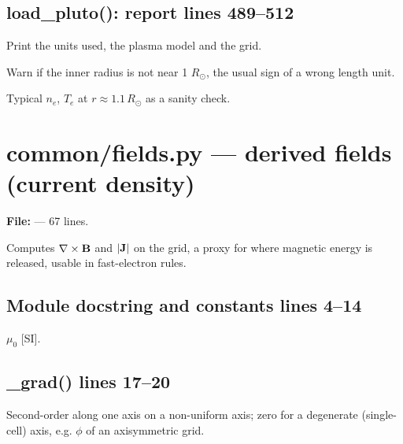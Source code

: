 \section*{\normalsize load\_pluto(): report \hfill{\small\mdseries\color{gray}lines 489--512}}

\begin{lines}
\item[L.493–499] Print the units used, the plasma model and the grid.
\item[L.500–502] Warn if the inner radius is not near 1 $R_\odot$, the usual sign of a wrong length unit.
\item[L.504–509] Typical $n_e$, $T_e$ at $r\approx1.1\,R_\odot$ as a sanity check.
\end{lines}

\chapter{common/fields.py --- derived fields (current density)}
\label{mod:common:fields.py}
\textbf{File:}  --- 67 lines.

Computes $\nabla\times\mathbf{B}$ and $|\mathbf{J}|$ on the grid, a proxy for where magnetic
energy is released, usable in fast-electron rules.

\section*{\normalsize Module docstring and constants \hfill{\small\mdseries\color{gray}lines 4--14}}

\begin{lines}
\item[L.14] $\mu_0$ [SI].
\end{lines}
\section*{\normalsize \_grad() \hfill{\small\mdseries\color{gray}lines 17--20}}

Second-order  along one axis on a non-uniform axis; zero for a degenerate (single-cell) axis, e.g. $\phi$ of an axisymmetric grid.

